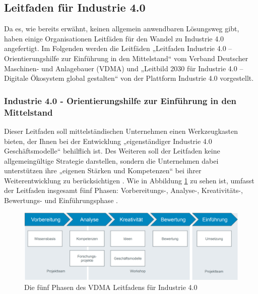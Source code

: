 \subsection{Leitfaden für Industrie 4.0}\label{sec:LeitfadenUmsetung}
Da es, wie bereits erwähnt, keinen allgemein anwendbaren Lösungsweg gibt, haben einige Organisationen Leitfäden für den Wandel zu Industrie 4.0 angefertigt. Im Folgenden werden die Leitfäden „Leitfaden Industrie 4.0 – Orientierungshilfe zur Einführung in den Mittelstand“ vom Verband Deutscher Maschinen- und Anlagebauer (VDMA) und „Leitbild 2030 für Industrie 4.0 – Digitale Ökosystem global gestalten“ von der Plattform Industrie 4.0 vorgestellt.

\subsubsection{Industrie 4.0 - Orientierungshilfe zur Einführung in den Mittelstand}\label{sec:VDMALeitfaden}
Dieser Leitfaden soll mittelständischen Unternehmen einen Werkzeugkasten bieten, der Ihnen bei der Entwicklung „eigenständiger Industrie 4.0 Geschäftsmodelle“ \cite[S.6]{2} behilflich ist. Des Weiteren soll der Leitfaden keine allgemeingültige Strategie darstellen, sondern die Unternehmen dabei unterstützen ihre „eigenen Stärken und Kompetenzen“ \cite[S.6]{2} bei ihrer Weiterentwicklung zu berücksichtigen \cite[S.6]{2}. Wie in Abbildung \ref{fig:VDMAAufbauLeitfaden} zu sehen ist, umfasst der Leitfaden insgesamt fünf Phasen: Vorbereitungs-, Analyse-, Kreativitäts-, Bewertungs- und Einführungsphase \cite[S.6]{2}.
\begin{figure}[h]
	\centering
	\includegraphics[width=1\linewidth]{Bilder/A5_VDMA_Phasen}
	\caption{Die fünf Phasen des VDMA Leitfadens für Industrie 4.0 \cite[S.10]{2}}
	\label{fig:VDMAAufbauLeitfaden}
\end{figure}

